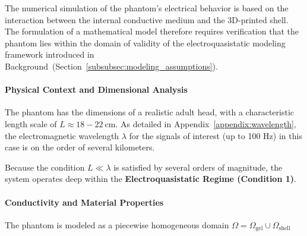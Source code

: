 The numerical simulation of the phantom’s electrical behavior is based on the interaction between the internal conductive medium and the 3D-printed shell.
The formulation of a mathematical model therefore requires verification that the phantom lies within the domain of validity of the electroquasistatic modeling
framework introduced in Background~(Section~\ref{subsubsec:modeling_assumptions}).

\paragraph*{Physical Context and Dimensional Analysis}

The phantom has the dimensions of a realistic adult head, with a characteristic length scale of $L \approx  18-22~\text{cm}$. As detailed in Appendix~\ref{appendix:wavelength},  the electromagnetic wavelength $\lambda$ for the signals of interest (up to 100 Hz) in this case is on the order of several kilometers. 

Because the condition $L \ll \lambda$ is satisfied by several orders of magnitude, the system operates deep within the \textbf{Electroquasistatic Regime (Condition 1)}.


\paragraph*{Conductivity and Material Properties}
The phantom is modeled as a piecewise homogeneous domain $\Omega = \Omega_{\text{gel}} \cup \Omega_{\text{shell}}$

